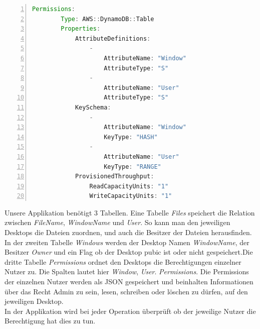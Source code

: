 \documentclass[a4paper, 12pt]{scrreprt}
\renewcommand\_{\textunderscore\allowbreak}
\begin{document}


\bigskip
\begin{lstlisting}[xleftmargin=\parindent,numbers=left,numberstyle=\small,numbersep=8pt,frame=L,mathescape=true, basicstyle=\small, language=Java, lineskip={1.0pt}]
Permissions:
        Type: AWS::DynamoDB::Table
        Properties:
            AttributeDefinitions:
                -
                    AttributeName: "Window"
                    AttributeType: "S"
                -
                    AttributeName: "User"
                    AttributeType: "S"
            KeySchema:
                -
                    AttributeName: "Window"
                    KeyType: "HASH"
                -
                    AttributeName: "User"
                    KeyType: "RANGE"
            ProvisionedThroughput:
                ReadCapacityUnits: "1"
                WriteCapacityUnits: "1"
\end{lstlisting}
\bigskip
Unsere Applikation benötigt 3 Tabellen. Eine Tabelle \textit{Files} speichert die Relation zwischen \textit{FileName}, \textit{WindowName} und \textit{User}. So kann man den jeweiligen Desktops die Dateien zuordnen, und auch die Besitzer der Dateien herausfinden. In der zweiten Tabelle \textit{Windows} werden der Desktop Namen \textit{WindowName}, der Besitzer \textit{Owner} und ein Flag ob der Desktop pubic ist oder nicht gespeichert.Die dritte Tabelle \textit{Permissions} ordnet den Desktops die Berechtigungen einzelner Nutzer zu. Die Spalten lautet hier \textit{Window}, \textit{User}. \textit{Permissions}. Die Permissions der einzelnen Nutzer werden als JSON gespeichert und beinhalten Informationen über das Recht Admin zu sein, lesen, schreiben oder löschen zu dürfen, auf den jeweiligen Desktop. \\
In der Applikation wird bei jeder Operation überprüft ob der jeweilige Nutzer die Berechtigung hat dies zu tun.
\end{document}
